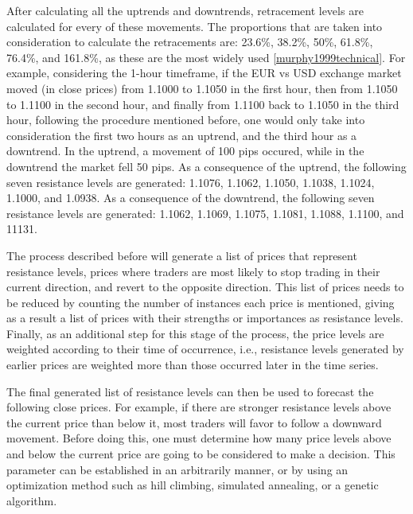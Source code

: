 \documentclass[letterpaper]{article}
\begin{document}
After calculating all the uptrends and downtrends, retracement levels
are calculated for every of these movements. The proportions that are taken
into consideration to calculate the retracements are: 23.6\%, 38.2\%,
50\%, 61.8\%, 76.4\%, and 161.8\%, as these are the most widely used
\ref{murphy1999technical}. For example, considering the 1-hour
timeframe, if the EUR vs USD exchange market moved (in close prices)
from 1.1000 to 1.1050 in the first hour, then from 1.1050 to 1.1100 in
the second hour, and finally from 1.1100 back to 1.1050 in the third
hour, following the procedure mentioned before, one would only take
into consideration the first two hours as an uptrend, and the third
hour as a downtrend. In the uptrend, a movement of 100 pips occured,
while in the downtrend the market fell 50 pips. As a consequence of the
uptrend, the following seven resistance levels are generated: 1.1076,
1.1062, 1.1050, 1.1038, 1.1024, 1.1000, and 1.0938. As a consequence
of the downtrend, the following seven resistance levels are generated:
1.1062, 1.1069, 1.1075, 1.1081, 1.1088, 1.1100, and 11131.

The process described before will generate a list of prices that
represent resistance levels, prices where traders are most likely to
stop trading in their current direction, and revert to the opposite
direction. This list of prices needs to be reduced by counting the
number of instances each price is mentioned, giving as a result a list
of prices with their strengths or importances as resistance
levels. Finally, as an additional step for this stage of the process,
the price levels are weighted according to their time of occurrence,
i.e., resistance levels generated by earlier prices are weighted more
than those occurred later in the time series.

The final generated list of resistance levels can then be used to
forecast the following close prices. For example, if there are
stronger resistance levels above the current price than below it, most
traders will favor to follow a downward movement. Before doing this,
one must determine how many price levels above and below the current
price are going to be considered to make a decision. This parameter
can be established in an arbitrarily manner, or by using an
optimization method such as hill climbing, simulated annealing, or a
genetic algorithm.
\end{document}
